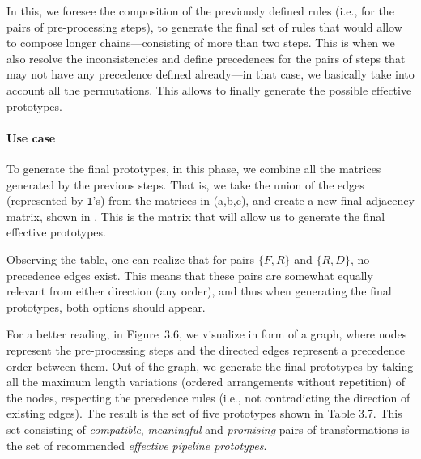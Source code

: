In this, we foresee the composition of the previously defined rules (i.e., for the pairs of pre-processing steps), to generate the final set of rules that would allow to compose longer chains---consisting of more than two steps.
This is when we also resolve the inconsistencies and define precedences for the pairs of steps that may not have any precedence defined already---in that case, we basically take into account all the permutations.
This allows to finally generate the possible effective  prototypes.

\paragraph{Use case}
To generate the final prototypes, in this phase, we combine all the matrices generated by the previous steps.
That is, we take the union of the edges (represented by \texttt{1}'s) from the matrices in  (a,b,c), and create a new final adjacency matrix, shown in .
This is the matrix that will allow us to generate the final effective prototypes.

Observing the table, one can realize that for pairs $\{F,R\}$ and $\{R,D\}$, no precedence edges exist.
This means that these pairs are somewhat equally relevant from either direction (any order), and thus when generating the final prototypes, both options should appear.

For a better reading, in Figure~3.6, we visualize  in form of a graph, where nodes represent the pre-processing steps and the directed edges represent a precedence order between them.
Out of the graph, we generate the final prototypes by taking all the maximum length variations (ordered arrangements without repetition) of the nodes, respecting the precedence rules (i.e., not contradicting the direction of existing edges).
The result is the set of five prototypes shown in Table 3.7. This set consisting of \textit{compatible}, \textit{meaningful} and \textit{promising} pairs of transformations is the set of recommended \textit{effective pipeline prototypes}.


